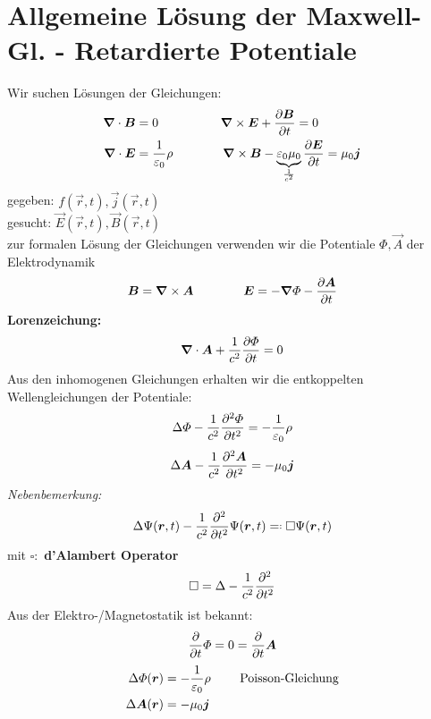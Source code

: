 
\section{Allgemeine Lösung der Maxwell-Gl. - Retardierte Potentiale}

Wir suchen Lösungen der Gleichungen:
\begin{align*}
\bm{\nabla} \cdot \bm{B} &= 0 \qquad \qquad \quad \bm{\nabla} \times \bm{E} + \frac{\partial \bm{B}}{\partial t} = 0\\
\bm{\nabla} \cdot \bm{E} &= \frac{1}{\varepsilon_0} \rho \qquad \qquad \bm{\nabla} \times \bm{B} - \underbrace{\varepsilon_0 \mu_0}_{\frac{1}{c^2}} \frac{\partial \bm{E}}{\partial t} = \mu_0 \bm{j}
\end{align*}
gegeben: $ f(\vec{r},t) , \vec{j}(\vec{r},t) $\\
gesucht: $ \vec{E}(\vec{r},t), \vec{B}(\vec{r},t) $\\[5pt]
zur formalen Lösung der Gleichungen verwenden wir die Potentiale $ \Phi , \vec{A} $ der Elektrodynamik
\begin{equation*}
\bm{B} = \bm{\nabla} \times \bm{A} \qquad \qquad \bm{E} = - \bm{\nabla} \varPhi - \frac{\partial \bm{A}}{\partial t}
\end{equation*}
\textbf{Lorenzeichung:}
\begin{equation*}
\bm{\nabla} \cdot \bm{A} + \frac{1}{c^2} \frac{\partial \varPhi}{\partial t} = 0
\end{equation*}
Aus den inhomogenen Gleichungen erhalten wir die entkoppelten Wellengleichungen der Potentiale:
\begin{equation*}
\Delta \varPhi - \frac{1}{c^2} \frac{\partial ^2 \varPhi}{\partial t^2} = - \frac{1}{\varepsilon_0} \rho
\end{equation*}
\begin{equation*}
\Delta \bm{A} - \frac{1}{c^2} \frac{\partial ^2 \bm{A}}{\partial t^2} = - \mu_0 \bm{j}
\end{equation*}
\emph{Nebenbemerkung:}
\begin{equation*}
\Delta \Psi (\vec{r},t) - \frac{1}{c^2} \prt{^2}{t^2} \Psi (\vec{r},t) \eqdef \square \Psi (\vec{r},t)
\end{equation*}
mit $ \square : $ \textbf{d'Alambert Operator}
\begin{equation*}
\square = \Delta - \frac{1}{c^2} \frac{\partial ^2}{\partial t^2}
\end{equation*}
Aus der Elektro-/Magnetostatik ist bekannt:
\begin{equation*}
\frac{\partial }{\partial t} \varPhi = 0 = \frac{\partial }{\partial t} \bm{A}
\end{equation*}
\begin{align*}
\Delta \varPhi(\bm{r}) &= - \frac{1}{\varepsilon_0} \rho \qquad \textrm{ Poisson-Gleichung}\\
\Delta \bm{A}(\bm{r}) &= - \mu_0 \bm{j}
\end{align*}
